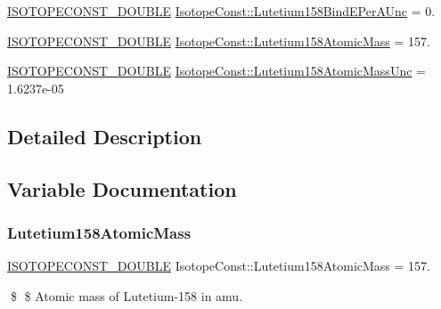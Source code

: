 \begin{DoxyCompactItemize}
\mbox{\hyperlink{group___isotope_const-_macros_ga8f45a7272ce02c0b4c65c44636ed719a}{I\+S\+O\+T\+O\+P\+E\+C\+O\+N\+S\+T\+\_\+\+D\+O\+U\+B\+LE}} \mbox{\hyperlink{group___isotope_const-_lutetium-_lu158_ga8570affe619ff306591e6aec0798625d}{Isotope\+Const\+::\+Lutetium158\+Bind\+E\+Per\+A\+Unc}} = 0.
\item 
\mbox{\hyperlink{group___isotope_const-_macros_ga8f45a7272ce02c0b4c65c44636ed719a}{I\+S\+O\+T\+O\+P\+E\+C\+O\+N\+S\+T\+\_\+\+D\+O\+U\+B\+LE}} \mbox{\hyperlink{group___isotope_const-_lutetium-_lu158_gaa8b9f7954094f624d816f5d90993086b}{Isotope\+Const\+::\+Lutetium158\+Atomic\+Mass}} = 157.
\item 
\mbox{\hyperlink{group___isotope_const-_macros_ga8f45a7272ce02c0b4c65c44636ed719a}{I\+S\+O\+T\+O\+P\+E\+C\+O\+N\+S\+T\+\_\+\+D\+O\+U\+B\+LE}} \mbox{\hyperlink{group___isotope_const-_lutetium-_lu158_ga044609b99c4f0d47cf002a3c8272ddea}{Isotope\+Const\+::\+Lutetium158\+Atomic\+Mass\+Unc}} = 1.\+6237e-\/05
\end{DoxyCompactItemize}


\subsection{Detailed Description}


\subsection{Variable Documentation}
\mbox{\label{group___isotope_const-_lutetium-_lu158_gaa8b9f7954094f624d816f5d90993086b}} 
\subsubsection{\texorpdfstring{Lutetium158\+Atomic\+Mass}{Lutetium158AtomicMass}}
{\footnotesize\ttfamily \mbox{\hyperlink{group___isotope_const-_macros_ga8f45a7272ce02c0b4c65c44636ed719a}{I\+S\+O\+T\+O\+P\+E\+C\+O\+N\+S\+T\+\_\+\+D\+O\+U\+B\+LE}} Isotope\+Const\+::\+Lutetium158\+Atomic\+Mass = 157.}

\$ \$ Atomic mass of Lutetium-\/158 in amu. \mbox{\label{group___isotope_const-_lutetium-_lu158_ga044609b99c4f0d47cf002a3c8272ddea}} 
